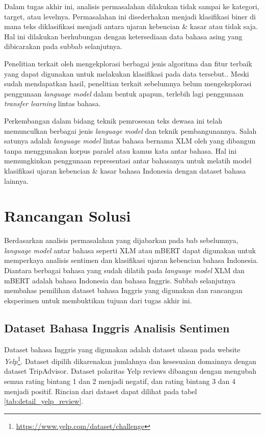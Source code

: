 	Dalam tugas akhir ini, analisis permasalahan dilakukan tidak sampai ke kategori, target, atau levelnya. Permasalahan ini disederhakan menjadi klasifikasi biner di mana teks diklasifikasi menjadi antara ujaran kebencian \& kasar atau tidak saja. Hal ini dilakukan berhubungan dengan ketersediaan data bahasa asing yang dibicarakan pada subbab selanjutnya.

	Penelitian terkait oleh \parencite{Ibrohim_Budi_2019} mengekplorasi berbagai jenis algoritma dan fitur terbaik yang dapat digunakan untuk melakukan klasifikasi pada data tersebut.. Meski sudah mendapatkan hasil, penelitian terkait sebelumnya belum mengeksplorasi penggunaan \textit{language model} dalam bentuk apapun, terlebih lagi penggunaan \textit{transfer learning} lintas bahasa.

	Perkembangan dalam bidang teknik pemrosesan teks dewasa ini telah memunculkan berbagai jenis \textit{language model} dan teknik pembangunannya. Salah satunya adalah \textit{language model} lintas bahasa bernama XLM oleh \parencite{LampleConneau2019} yang dibangun tanpa menggunakan korpus paralel atau kamus kata antar bahasa. Hal ini memungkinkan penggunaan representasi antar bahasanya untuk melatih model klasifikasi ujaran kebencian \& kasar bahasa Indonesia dengan dataset bahasa lainnya.

\section{Rancangan Solusi}
	Berdasarkan analisis permasalahan yang dijabarkan pada bab sebelumnya, \textit{language model} antar bahasa seperti XLM atau mBERT dapat digunakan untuk memperkaya analisis sentimen dan klasifikasi ujaran kebencian bahasa Indonesia. Diantara berbagai bahasa yang sudah dilatih pada \textit{language model} XLM dan mBERT adalah bahasa Indonesia dan bahasa Inggris. Subbab selanjutnya membahas pemilihan dataset bahasa Inggris yang digunakan dan rancangan eksperimen untuk membuktikan tujuan dari tugas akhir ini.

	\subsection{Dataset Bahasa Inggris Analisis Sentimen}
	Dataset bahasa Inggris yang digunakan adalah dataset ulasan pada website \textit{Yelp}\footnote{\url{https://www.yelp.com/dataset/challenge}}. Dataset dipilih dikarenakan jumlahnya dan kesesuaian domainnya dengan dataset TripAdvisor. Dataset polaritas Yelp reviews  dibangun dengan mengubah semua rating bintang 1 dan 2 menjadi negatif, dan rating bintang 3 dan 4 menjadi positif. Rincian dari dataset dapat dilihat pada tabel \ref{tab:detail_yelp_review}.

